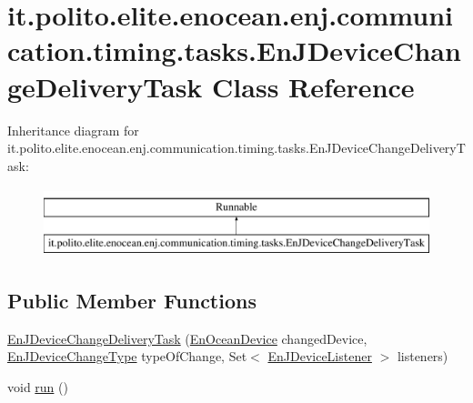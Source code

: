 \hypertarget{classit_1_1polito_1_1elite_1_1enocean_1_1enj_1_1communication_1_1timing_1_1tasks_1_1_en_j_device_change_delivery_task}{}\section{it.\+polito.\+elite.\+enocean.\+enj.\+communication.\+timing.\+tasks.\+En\+J\+Device\+Change\+Delivery\+Task Class Reference}
\label{classit_1_1polito_1_1elite_1_1enocean_1_1enj_1_1communication_1_1timing_1_1tasks_1_1_en_j_device_change_delivery_task}
Inheritance diagram for it.\+polito.\+elite.\+enocean.\+enj.\+communication.\+timing.\+tasks.\+En\+J\+Device\+Change\+Delivery\+Task\+:\begin{figure}[H]
\begin{center}
\leavevmode
\includegraphics[height=2.000000cm]{classit_1_1polito_1_1elite_1_1enocean_1_1enj_1_1communication_1_1timing_1_1tasks_1_1_en_j_device_change_delivery_task}
\end{center}
\end{figure}
\subsection*{Public Member Functions}
\begin{DoxyCompactItemize}
\item 
\hyperlink{classit_1_1polito_1_1elite_1_1enocean_1_1enj_1_1communication_1_1timing_1_1tasks_1_1_en_j_device_change_delivery_task_a72a97d7ae51017fd667bf27c7b80d823}{En\+J\+Device\+Change\+Delivery\+Task} (\hyperlink{classit_1_1polito_1_1elite_1_1enocean_1_1enj_1_1model_1_1_en_ocean_device}{En\+Ocean\+Device} changed\+Device, \hyperlink{enumit_1_1polito_1_1elite_1_1enocean_1_1enj_1_1communication_1_1_en_j_device_change_type}{En\+J\+Device\+Change\+Type} type\+Of\+Change, Set$<$ \hyperlink{interfaceit_1_1polito_1_1elite_1_1enocean_1_1enj_1_1communication_1_1_en_j_device_listener}{En\+J\+Device\+Listener} $>$ listeners)
\item 
void \hyperlink{classit_1_1polito_1_1elite_1_1enocean_1_1enj_1_1communication_1_1timing_1_1tasks_1_1_en_j_device_change_delivery_task_a54198d8c4dd296c972d29505a9da6422}{run} ()
\end{DoxyCompactItemize}


